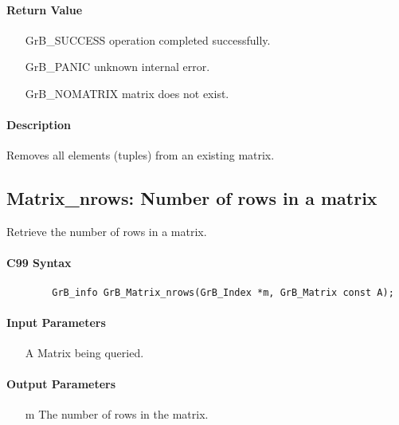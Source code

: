 \paragraph{Return Value}

\begin{itemize}[leftmargin=2.1in]
\item[{\sf GrB\_SUCCESS}]   operation completed successfully.
\item[{\sf GrB\_PANIC}]     unknown internal error.
\item[{\sf GrB\_NOMATRIX}]  matrix does not exist.
\end{itemize}

\paragraph{Description}

Removes all elements (tuples) from an existing matrix.

\subsection{{\sf Matrix\_nrows}: Number of rows in a matrix}

Retrieve the number of rows in a matrix.

\paragraph{C99 Syntax}

\begin{verbatim}
        GrB_info GrB_Matrix_nrows(GrB_Index *m, GrB_Matrix const A);
\end{verbatim}

\paragraph{Input Parameters}

\begin{itemize}[leftmargin=1.1in]
    \item[{\sf A}] Matrix being queried.
\end{itemize}

\paragraph{Output Parameters}
\begin{itemize}[leftmargin=1.1in]
    \item[{\sf m}] The number of rows in the matrix.
\end{itemize}

